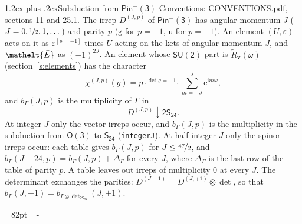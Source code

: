 \documentclass[10pt,a4paper]{article}
\makeatletter
\renewcommand\section{\@startsection{section}{1}{\z@}{-3ex plus -1ex minus -.2ex}%
  {1.2ex plus .2ex}{\normalfont\large\sffamily\bfseries\color{parttitle}}}
\newcommand{\needspace}[1]{\par\penalty-100\begingroup\dimen0=#1\relax\dimen2=\pagegoal
  \advance\dimen2-\pagetotal\ifdim\dimen0>\dimen2\relax\ifdim\dimen2>0pt\vfil\break\fi\fi
  \endgroup}
\numberwithin{equation}{section}
\newcommand{\eltfont}[1]{{\let\sigma\eltsigma\mathelt{#1}}}
\newcommand{\grp}[1]{\mathsf{#1}}
\newcommand{\elt}[1]{\eltfont{#1}}
\newcommand{\ptag}[1]{\mathrm{#1}}
\newcommand{\iverson}[1]{[#1]}
\newcommand{\restr}[2]{#1\!\downarrow#2}
\newcommand{\vv}{\mathbf{v}}
\newcommand{\iunit}{\mathrm{i}}
\newcommand{\expe}{\mathrm{e}}
\newcommand{\irrJp}[2]{D^{(#1,#2)}}
\newcommand{\irrprod}{\otimes}
\newcommand{\barred}[1]{\bar{#1}}
\newcommand{\lift}[1]{\tilde{#1}}
\makeatother
\begin{document}
\section{Subduction from \texorpdfstring{$\grp{Pin^{-}(3)}$}{Pin(3)}}\label{s:subduction_parent}
Conventions: \href{../../CONVENTIONS.pdf}{CONVENTIONS.pdf}, sections \href{../../../rotation/CONVENTIONS.pdf\#conv.11}{11} and \href{../../CONVENTIONS.pdf\#conv.25.1}{25.1}.
\leavevmode\label{n:index.J}\label{n:index.parity}\label{n:irrep.o3}The irrep $\irrJp{J}{p}$ of \href{Pinminus3.pdf}{$\grp{Pin^{-}(3)}$} has angular momentum $J$ ($J = 0, \nicefrac{1}{2}, 1, \dots$) and parity $p$ ($\ptag{g}$ for $p = +1$, $\ptag{u}$ for $p = -1$). An element $(U, \varepsilon)$ acts on it as $\varepsilon^{[p = -1]}$ times $U$ acting on the kets of angular momentum $J$, and $\elt{\barred{E}}$ as $(-1)^{2J}$. \label{n:function.character.parent}\label{n:function.multiplicity}An element whose $\grp{SU(2)}$ part is $\lift{R}_{\vv}(\omega)$ (section~\ref{s:elements}) has the character
\begin{equation}\label{e:chi}\chi^{(J,p)}(g) = p^{\iverson{\det g = -1}}\sum_{m=-J}^{J} \expe^{\iunit m\omega},\end{equation}
and $b_\Gamma(J, p)$ is the multiplicity of $\Gamma$ in
\begin{equation}\label{e:parent}\restr{\irrJp{J}{p}}{\grp{2S_{24}}}.\end{equation}
At integer $J$ only the vector irreps occur, and $b_\Gamma(J, p)$ is the multiplicity in the subduction from $\grp{O(3)}$ to \href{../../../rotation/data/pdf/S24.pdf}{$\grp{S_{24}}$} (\texttt{integerJ}). \label{n:index.increment}At half-integer $J$ only the spinor irreps occur: each table gives $b_\Gamma(J, p)$ for $J \le \nicefrac{47}{2}$, and $b_\Gamma(J + 24, p) = b_\Gamma(J, p) + \Delta_\Gamma$ for every $J$, where $\Delta_\Gamma$ is the last row of the table of parity $p$. A table leaves out irreps of multiplicity 0 at every $J$.
\leavevmode\label{n:operator.determinant.character}The determinant exchanges the parities: $\irrJp{J}{-1} = \irrJp{J}{+1} \irrprod \det$, so that $b_\Gamma(J, -1) = b_{\Gamma \irrprod \det_{\grp{2S_{24}}}}(J, +1)$.
\needspace{82pt}
\end{document}

